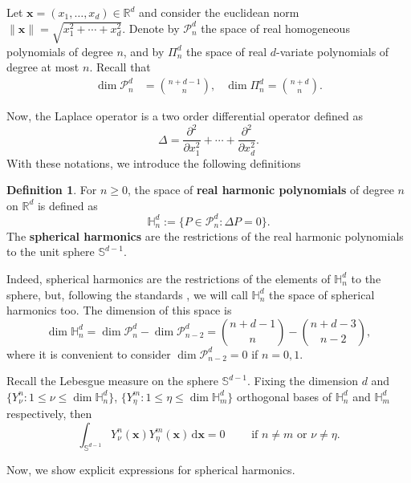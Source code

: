 \documentclass[a4paper]{article}
\theoremstyle{plain}
\theoremstyle{definition}
\newtheorem{definition}[theorem]{Definition}
\newcommand{\RR}{\mathbb{R}}
\newcommand{\dr}{\mathrm{d}}
\begin{document}
Let $\mathbf x =(x_1,\dots,x_d)\in\RR^d$ and consider the euclidean norm $\|\mathbf x\|=\sqrt{x_1^2+\cdots+x_d^2}$. Denote by $\mathcal P_{n}^d$ the space of real homogeneous polynomials of degree $n$, and by $\Pi_n^d$ the space of real $d$-variate polynomials of degree at most $n$. Recall that \cite[Section 1.1]{FX13}
\begin{align}\label{eq:dimensions}
        \dim \mathcal P_n^d &= \binom{n+d-1}{n},& \dim\Pi_n^d =\binom{n+d}{n}.
\end{align}
    
Now, the Laplace operator is a two order differential operator defined as
$$
\Delta = \dfrac{\partial^2}{\partial x_1^2}+\cdots+\dfrac{\partial^2}{\partial x_d^2}.
$$
With these notations, we introduce the following definitions
\begin{definition}
For $n\geq 0$, the space of \textbf{real harmonic polynomials}  of degree $n$ on $\RR^d$ is defined as
$$
\mathbb H_n^d := \{P\in \mathcal P_n^d : \Delta P =0\}. 
$$
The \textbf{spherical harmonics} are the restrictions of the real harmonic polynomials to the unit sphere $\mathbb S^{d-1}$.
\end{definition}

Indeed, spherical harmonics are the restrictions of the elements of $\mathbb H_n^d $ to the sphere, but, following the standards \cite{FX13}, we will call $\mathbb H_n^d$ the space of spherical harmonics too. The dimension of this space is \cite[Corollary 1.1.4]{FX13}
    \begin{equation}
        \label{eq_dim-H}
        \dim \mathbb H_n^d = \dim \mathcal P_n^d-\dim \mathcal P_{n-2}^d =\binom{n+d-1}{n}-\binom{n+d-3}{n-2},
    \end{equation}
    where it is convenient to consider $\dim \mathcal P_{n-2}^d=0$ if $n=0,1$. 
    
    Recall the Lebesgue measure on the sphere $\mathbb S^{d-1}$. Fixing the dimension $d$ and $\{Y_\nu^n: 1\leq\nu\leq \dim \mathbb H_n^d\}$, $\{Y_\eta^m: 1\leq\eta\leq \dim \mathbb H_m^d\}$ orthogonal bases of $\mathbb H_n^d$ and $\mathbb H_m^d$ respectively, then \cite[Theorem 1.1.2]{FX13}
    \begin{equation}
        \label{eq:orthogonality-harmonics}
        \int_{\mathbb S^{d-1}}Y_\nu^n(\mathbf x)Y_\eta^m(\mathbf x)\,\dr \mathbf x = 0\qquad \text{ if }n\neq m\text{ or }\nu\neq\eta.
    \end{equation}

    Now, we show explicit expressions for spherical harmonics.
\end{document}
